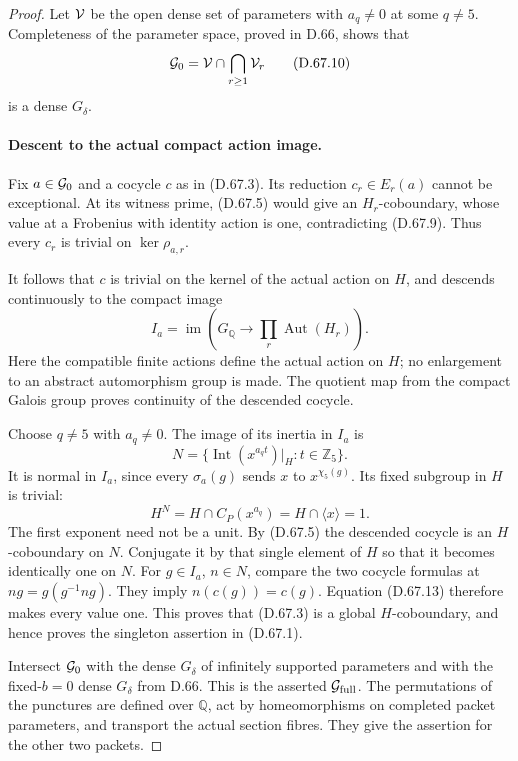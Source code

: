 \begin{proof}
Let \({\cal V}\) be the open dense set of
parameters with \(a_q\ne0\) at some
\(q\ne5\). Completeness of the parameter
space, proved in D.66, shows that
\[
                   {\cal G}_0={\cal V}\cap\bigcap_{r\ge1}{\cal V}_r
                                                        \tag{D.67.10}
\]
is a dense \(G_\delta\).

\paragraph{Descent to the actual compact action image.}
Fix \(a\in{\cal G}_0\) and a cocycle
\(c\) as in (D.67.3). Its reduction
\(c_r\in E_r(a)\) cannot be exceptional.
At its witness prime, (D.67.5) would give
an \(H_r\)-coboundary, whose value at a
Frobenius with identity action is one,
contradicting (D.67.9). Thus every \(c_r\)
is trivial on \(\ker\rho_{a,r}\).

It follows that \(c\) is trivial on the
kernel of the actual action on \(H\), and
descends continuously to the compact image
\[
          I_a=\operatorname{im}\left(
             G_{\mathbb Q}\longrightarrow
                         \prod_r\operatorname{Aut}(H_r)\right).
                                                        \tag{D.67.11}
\]
Here the compatible finite actions define
the actual action on \(H\); no enlargement
to an abstract automorphism group is made.
The quotient map from the compact Galois
group proves continuity of the descended
cocycle.

Choose \(q\ne5\) with \(a_q\ne0\).
The image of its inertia in \(I_a\) is
\[
 N=\{\operatorname{Int}(x^{a_q t})|_H:t\in\mathbb Z_5\}.
                                                        \tag{D.67.12}
\]
It is normal in \(I_a\), since every
\(\sigma_a(g)\) sends \(x\) to
\(x^{\chi_5(g)}\). Its fixed subgroup
in \(H\) is trivial:
\[
              H^N=H\cap C_P(x^{a_q})
                    =H\cap\langle x\rangle=1.          \tag{D.67.13}
\]
The first exponent need not be a unit.
By (D.67.5) the descended cocycle is an
\(H\)-coboundary on \(N\). Conjugate it
by that single element of \(H\) so that
it becomes identically one on \(N\).
For \(g\in I_a\), \(n\in N\), compare
the two cocycle formulas at
\(ng=g(g^{-1}ng)\). They imply
\(n(c(g))=c(g)\). Equation (D.67.13)
therefore makes every value one. This
proves that (D.67.3) is a global
\(H\)-coboundary, and hence proves
the singleton assertion in (D.67.1).

Intersect \({\cal G}_0\) with the dense
\(G_\delta\) of infinitely supported
parameters and with the fixed-\(b=0\)
dense \(G_\delta\) from D.66. This is
the asserted \({\cal G}_{\rm full}\).
The permutations of the punctures are
defined over \(\mathbb Q\), act by
homeomorphisms on completed packet
parameters, and transport the actual
section fibres. They give the assertion
for the other two packets.


\end{proof}
